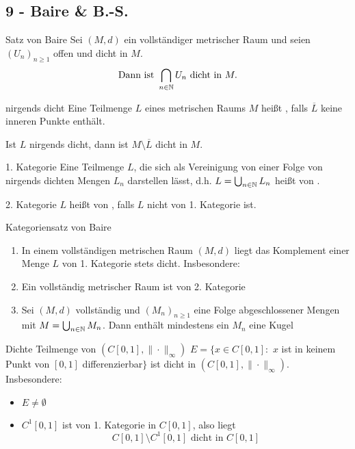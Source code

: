 \subsection*{9 - Baire \& B.-S.}

	\begin{karte}{Satz von Baire}
		Sei $(M, d)$ ein vollständiger metrischer Raum und seien $(U_{n})_{n \geq 1}$ offen und dicht in $M$.
		\[ \text{Dann ist } \bigcap_{n \in \mathbb{N}} U_{n} \text{ dicht in } M. \]
	\end{karte}
	
	
	\begin{karte}{nirgends dicht}
		Eine Teilmenge $L$ eines metrischen Raums $M$ hei{\ss}t , falls $\overline{L}$ keine inneren Punkte enthält.
		
		Ist $L$ nirgends dicht, dann ist $M \setminus \overline{L}$ dicht in $M$.	
	\end{karte}

	\begin{karte}{1. Kategorie}
		Eine Teilmenge $L$, die sich als Vereinigung von einer Folge von nirgends dichten Mengen $L_{n}$ darstellen lässt, d.h. $L = \bigcup_{n \in \mathbb{N}} L_{n}$ hei{\ss}t von .		
	\end{karte}

	\begin{karte}{2. Kategorie}
		$L$ hei{\ss}t von , falls $L$ nicht von 1. Kategorie ist.		
	\end{karte}
	
	\begin{karte}{Kategoriensatz von Baire}
		\begin{enumerate}[label=\alph*\upshape)]
			\item In einem vollständigen metrischen Raum $(M, d)$ liegt das Komplement einer Menge $L$ von 1. Kategorie stets dicht. Insbesondere:
			\item Ein vollständig metrischer Raum ist von 2. Kategorie
			\item Sei $(M, d)$ vollständig und $(M_{n})_{n \geq 1}$ eine Folge abgeschlossener Mengen mit $M = \bigcup_{n \in \mathbb{N}} M_{n}$. Dann enthält mindestens ein $M_{n}$ eine Kugel
		\end{enumerate}	
	\end{karte}

	\begin{karte}{Dichte Teilmenge von $(C[0, 1], \|\cdot\|_{\infty})$}	
		$E = \{ x \in C[0, 1]:$ $x$ ist in keinem Punkt von $[0, 1]$ differenzierbar$\}$ ist dicht in $(C[0, 1], \|\cdot\|_{\infty})$. \\
		Insbesondere:
 		\begin{itemize}
			\item $E \neq \emptyset$
			\item $C^{1}[0, 1]$ ist von 1. Kategorie in $C[0, 1]$, also liegt 
				\[ C[0, 1] \setminus C^{1}[0, 1] \text{ dicht in } C[0, 1] \]
		\end{itemize}
	\end{karte}
	
